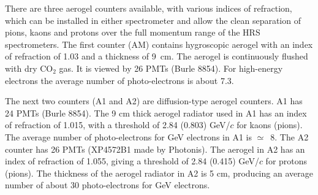 There are  three aerogel \Cherenkov{} counters available, with various indices
of refraction, which can be installed in either spectrometer and allow 
the clean separation of pions, kaons and protons over the full momentum 
range of the HRS spectrometers.
The first counter (AM) contains hygroscopic aerogel with an index of refraction 
of 1.03 and a thickness of 9~cm. 
The aerogel is continuously flushed with dry CO$_{2}$ gas.  
It is viewed by 26 PMTs (Burle 8854). 
For high-energy electrons the average number of photo-electrons is about 7.3. 

The next two counters (A1 and A2) are diffusion-type aerogel 
counters. A1 has 24 PMTs (Burle 8854). 
The 9 cm thick aerogel radiator used in A1 has an index of refraction of 1.015, 
with a threshold of 2.84 (0.803) GeV/$c$ for kaons (pions). 
The average number of photo-electrons for GeV electrons 
in A1 is $\simeq$~8. The A2 counter has 26 PMTs (XP4572B1 made by Photonis). 
The aerogel in A2 has an index of refraction of 1.055, 
giving a threshold of 2.84 (0.415) GeV/$c$ for protons (pions). 
The thickness of the aerogel radiator in A2 is 5 cm, producing an average 
number of about 30 photo-electrons for GeV electrons.

